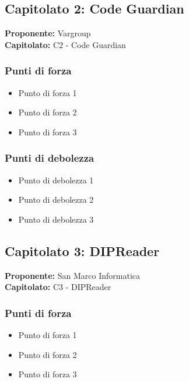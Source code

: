 \documentclass[a4paper,12pt]{article}
\begin{document}
\subsection{Capitolato 2: Code Guardian}

\begin{tcolorbox}[colback=lightgray!30,colframe=darkgray,arc=2mm,boxrule=0.3pt]
\textbf{Proponente:} Vargroup \\
\textbf{Capitolato:} C2 - Code Guardian
\end{tcolorbox}

\subsubsection{Punti di forza}
\begin{itemize}
\item Punto di forza 1
\item Punto di forza 2
\item Punto di forza 3
\end{itemize}

\subsubsection{Punti di debolezza}
\begin{itemize}
\item Punto di debolezza 1
\item Punto di debolezza 2
\item Punto di debolezza 3
\end{itemize}

\subsection{Capitolato 3: DIPReader}

\begin{tcolorbox}[colback=lightgray!30,colframe=darkgray,arc=2mm,boxrule=0.3pt]
\textbf{Proponente:} San Marco Informatica \\
\textbf{Capitolato:} C3 - DIPReader
\end{tcolorbox}

\subsubsection{Punti di forza}
\begin{itemize}
\item Punto di forza 1
\item Punto di forza 2
\item Punto di forza 3
\end{itemize}
\end{document}
